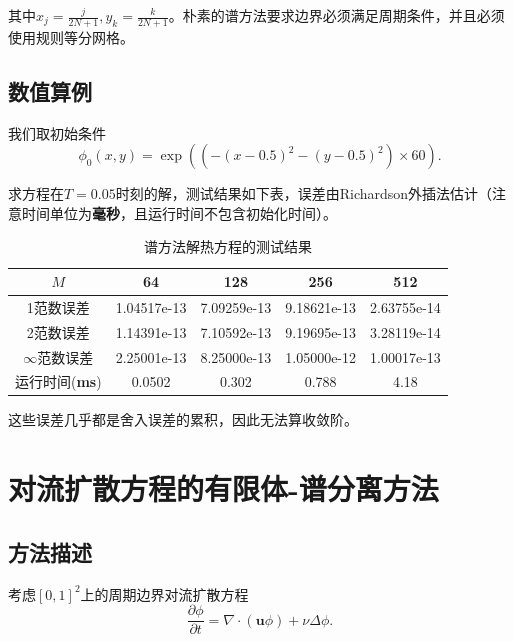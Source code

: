 \documentclass[lang=cn,10pt,bibend=bibtex]{elegantbook}
\begin{document}
其中$x_j=\frac{j}{2N+1},y_k=\frac{k}{2N+1}$。朴素的谱方法要求边界必须满足周期条件，并且必须使用规则等分网格。

\subsection{数值算例}

我们取初始条件
\begin{equation}
    \phi_0(x,y)=\exp((-(x-0.5)^2-(y-0.5)^2)\times 60).
\end{equation}

求方程在$T=0.05$时刻的解，测试结果如下表，误差由Richardson外插法估计（注意时间单位为\textbf{毫秒}，且运行时间不包含初始化时间）。

\begin{table}[H]
    \centering
    \small
    \begin{tabular}{c|cccc}
    \textbf{$M$}              & 64           & 128          & 256          & 512   \\ \hline
    1范数误差                  & 1.04517e-13   & 7.09259e-13   & 9.18621e-13  & 2.63755e-14 \\
    2范数误差                  & 1.14391e-13   & 7.10592e-13   & 9.19695e-13  & 3.28119e-14 \\
    $\infty$范数误差           & 2.25001e-13   & 8.25000e-13   & 1.05000e-12  & 1.00017e-13 \\
    运行时间(\textbf{ms})                & 0.0502              & 0.302             & 0.788          & 4.18
    \end{tabular}
    \caption{谱方法解热方程的测试结果}
\end{table}

这些误差几乎都是舍入误差的累积，因此无法算收敛阶。

\vspace{-.5em}

\section{对流扩散方程的有限体-谱分离方法}

\vspace{-.5em}

\subsection{方法描述}

考虑$[0,1]^2$上的周期边界对流扩散方程
\begin{equation*}
    \frac{\partial \phi}{\partial t}=\nabla\cdot(\mathbf{u}\phi)+\nu \Delta\phi.
\end{equation*}
\end{document}

